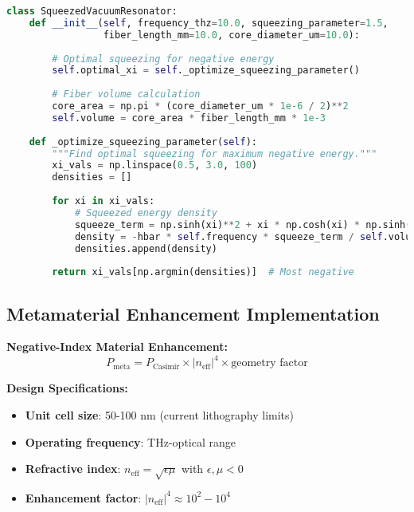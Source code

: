 \documentclass[11pt]{article}
\begin{document}
\begin{lstlisting}[language=Python]
class SqueezedVacuumResonator:
    def __init__(self, frequency_thz=10.0, squeezing_parameter=1.5,
                 fiber_length_mm=10.0, core_diameter_um=10.0):
        
        # Optimal squeezing for negative energy
        self.optimal_xi = self._optimize_squeezing_parameter()
        
        # Fiber volume calculation
        core_area = np.pi * (core_diameter_um * 1e-6 / 2)**2
        self.volume = core_area * fiber_length_mm * 1e-3
        
    def _optimize_squeezing_parameter(self):
        """Find optimal squeezing for maximum negative energy."""
        xi_vals = np.linspace(0.5, 3.0, 100)
        densities = []
        
        for xi in xi_vals:
            # Squeezed energy density
            squeeze_term = np.sinh(xi)**2 + xi * np.cosh(xi) * np.sinh(xi)
            density = -hbar * self.frequency * squeeze_term / self.volume
            densities.append(density)
        
        return xi_vals[np.argmin(densities)]  # Most negative
\end{lstlisting}

\subsection{Metamaterial Enhancement Implementation}

\textbf{Negative-Index Material Enhancement:}
\begin{equation}
P_{\text{meta}} = P_{\text{Casimir}} \times |n_{\text{eff}}|^4 \times \text{geometry factor}
\end{equation}

\textbf{Design Specifications:}
\begin{itemize}
    \item \textbf{Unit cell size}: 50-100 nm (current lithography limits)
    \item \textbf{Operating frequency}: THz-optical range
    \item \textbf{Refractive index}: $n_{\text{eff}} = \sqrt{\epsilon \mu}$ with $\epsilon, \mu < 0$
    \item \textbf{Enhancement factor}: $|n_{\text{eff}}|^4 \approx 10^2-10^4$
\end{itemize}
\end{document}
